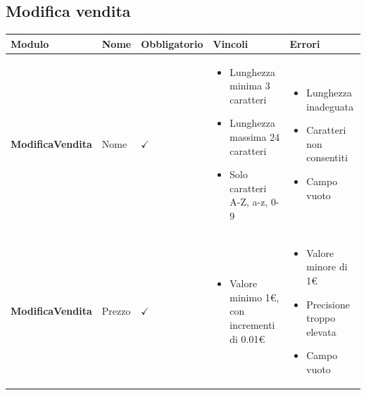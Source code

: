 \documentclass[12pt]{article}
\begin{document}
 \subsection{Modifica vendita}
 \setlength\LTleft{0pt}
 \setlength\LTright{0pt}
 \begin{longtable}{|l|l|l|l|l|}
 \hline
 Modulo & Nome & Obbligatorio & Vincoli & Errori\\\hline
 \endhead
 \hline
 \textbf{ModificaVendita} & Nome & $\checkmark$ & \begin{minipage}{3.5cm}
 \vspace{5pt}
 \begin{itemize}
 \item Lunghezza minima 3 caratteri
 \item Lunghezza massima 24 caratteri
 \item Solo caratteri A-Z, a-z, 0-9
 \end{itemize}
 \vspace{5pt}
 \end{minipage} & \begin{minipage}{4cm}
 \vspace{5pt}
 \begin{itemize}
 \item Lunghezza inadeguata
 \item Caratteri non consentiti
 \item Campo vuoto
 \end{itemize}
 \vspace{5pt}
 \end{minipage} \\ \hline
 
 \textbf{ModificaVendita} & Prezzo & $\checkmark$ & \begin{minipage}{3.5cm}
 \vspace{5pt}
 \begin{itemize}
 \item Valore minimo 1€, con incrementi di 0.01€
 \end{itemize}
 \vspace{5pt}
 \end{minipage} & \begin{minipage}{4cm}
 \vspace{5pt}
 \begin{itemize}
 \item Valore minore di 1€
 \item Precisione troppo elevata
 \item Campo vuoto
 \end{itemize}
 \vspace{5pt}
 \end{minipage} \\ \hline
 

\end{longtable}
\end{document}
